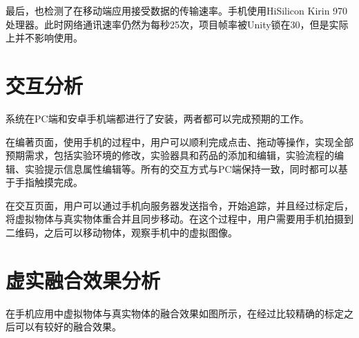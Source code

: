 最后，也检测了在移动端应用接受数据的传输速率。手机使用HiSilicon Kirin 970处理器。此时网络通讯速率仍然为每秒25次，项目帧率被Unity锁在30，但是实际上并不影响使用。

\section{交互分析}
系统在PC端和安卓手机端都进行了安装，两者都可以完成预期的工作。

在编著页面，使用手机的过程中，用户可以顺利完成点击、拖动等操作，实现全部预期需求，包括实验环境的修改，实验器具和药品的添加和编辑，实验流程的编辑、实验提示信息属性编辑等。所有的交互方式与PC端保持一致，同时都可以基于手指触摸完成。

在交互页面，用户可以通过手机向服务器发送指令，开始追踪，并且经过标定后，将虚拟物体与真实物体重合并且同步移动。在这个过程中，用户需要用手机拍摄到二维码，之后可以移动物体，观察手机中的虚拟图像。

\section{虚实融合效果分析}

在手机应用中虚拟物体与真实物体的融合效果如图所示，在经过比较精确的标定之后可以有较好的融合效果。